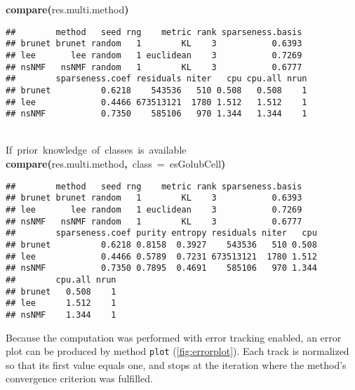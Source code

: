 \documentclass[a4paper]{article}\usepackage{graphicx, color}
\makeatletter
\newcommand{\hlfunctioncall}[1]{\textcolor[rgb]{0.501960784313725,0,0.329411764705882}{\textbf{#1}}}%
\newcommand{\hlkeyword}[1]{\textcolor[rgb]{0,0,0}{\textbf{#1}}}%
\newcommand{\hlargument}[1]{\textcolor[rgb]{0.690196078431373,0.250980392156863,0.0196078431372549}{#1}}%
\newcommand{\hlcomment}[1]{\textcolor[rgb]{0.180392156862745,0.6,0.341176470588235}{#1}}%
\newcommand{\hlsymbol}[1]{\textcolor[rgb]{0,0,0}{#1}}%
\newcommand{\hlstd}[1]{\textcolor[rgb]{0,0,0}{#1}}%
\newenvironment{kframe}{%
 \def\FrameCommand##1{\hskip\@totalleftmargin \hskip-\fboxsep
 \colorbox{shadecolor}{##1}\hskip-\fboxsep
     \hskip-\linewidth \hskip-\@totalleftmargin \hskip\columnwidth}%
 \MakeFramed {\advance\hsize-\width
   \@totalleftmargin\z@ \linewidth\hsize
   \@setminipage}}%
 {\par\unskip\endMakeFramed}
\newenvironment{knitrout}{}{} %
\let\code=\texttt
\makeatother
\begin{document}
\begin{knitrout}
\color{fgcolor}\begin{kframe}
\begin{flushleft}
\ttfamily\noindent
\hlfunctioncall{compare}\hlkeyword{(}\hlsymbol{res.multi.method}\hlkeyword{)}\mbox{}
\normalfont
\end{flushleft}
\begin{verbatim}
##        method   seed rng    metric rank sparseness.basis
## brunet brunet random   1        KL    3           0.6393
## lee       lee random   1 euclidean    3           0.7269
## nsNMF   nsNMF random   1        KL    3           0.6777
##        sparseness.coef residuals niter   cpu cpu.all nrun
## brunet          0.6218    543536   510 0.508   0.508    1
## lee             0.4466 673513121  1780 1.512   1.512    1
## nsNMF           0.7350    585106   970 1.344   1.344    1
\end{verbatim}
\begin{flushleft}
\ttfamily\noindent
\hspace*{\fill}\\
\hlstd{}\hlcomment{\usebox{\hlnormalsizeboxhash}{\ }If{\ }prior{\ }knowledge{\ }of{\ }classes{\ }is{\ }available}\hspace*{\fill}\\
\hlstd{}\hlfunctioncall{compare}\hlkeyword{(}\hlsymbol{res.multi.method}\hlkeyword{,}{\ }\hlargument{class}{\ }\hlargument{=}{\ }\hlsymbol{esGolub}\hlkeyword{\usebox{\hlnormalsizeboxdollar}}\hlsymbol{Cell}\hlkeyword{)}\mbox{}
\normalfont
\end{flushleft}
\begin{verbatim}
##        method   seed rng    metric rank sparseness.basis
## brunet brunet random   1        KL    3           0.6393
## lee       lee random   1 euclidean    3           0.7269
## nsNMF   nsNMF random   1        KL    3           0.6777
##        sparseness.coef purity entropy residuals niter   cpu
## brunet          0.6218 0.8158  0.3927    543536   510 0.508
## lee             0.4466 0.5789  0.7231 673513121  1780 1.512
## nsNMF           0.7350 0.7895  0.4691    585106   970 1.344
##        cpu.all nrun
## brunet   0.508    1
## lee      1.512    1
## nsNMF    1.344    1
\end{verbatim}
\end{kframe}
\end{knitrout}


Because the computation was performed with error tracking enabled, an error plot
can be produced by method \code{plot} (\cref{fig:errorplot}).
Each track is normalized so that its first value equals one, and stops at the iteration where the method's convergence criterion was fulfilled.
\end{document}
